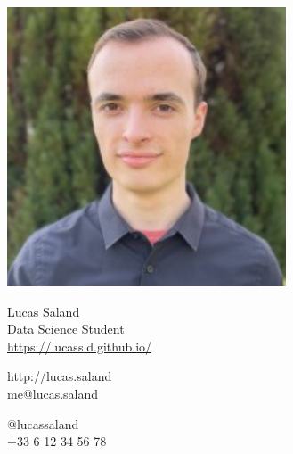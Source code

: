 \documentclass{article}
\begin{document}
\centering \includegraphics[width=.15\linewidth]{logo}\\[2pt]
\parbox{2in}{\Large \centering Lucas Saland\\[1pt]
\normalsize Data Science Student\\
\url{https://lucassld.github.io/}}

\vfill
\raggedright
\begin{multicols}{2}
http://lucas.saland\\
me@lucas.saland

\columnbreak
\raggedleft
@lucassaland\\
+33 6 12 34 56 78%
\end{multicols}%
\end{document}
